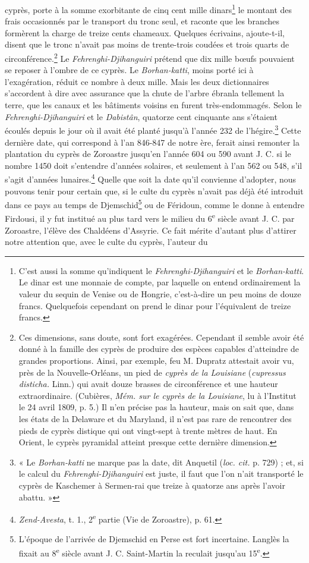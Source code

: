 \documentclass{article}
\begin{document}
cyprès, porte à la somme exorbitante de cinq cent mille dinars\footnote{C'est aussi la somme qu'indiquent le \emph{Fehrenghi-Djihanguiri} et le \emph{Borhan-katti}. Le dinar est une monnaie de compte, par laquelle on entend ordinairement la valeur du sequin de Venise ou de Hongrie, c'est-à-dire un peu moins de douze francs. Quelquefois cependant on prend le dinar pour l'équivalent de treize francs.} le montant des frais occasionnés par le transport du tronc seul, et raconte que les branches formèrent la charge de treize cents chameaux. Quelques écrivains, ajoute-t-il, disent que le tronc n'avait pas moins de trente-trois coudées et trois quarts de circonférence.\footnote{Ces dimensions, sans doute, sont fort exagérées. Cependant il semble avoir été donné à la famille des cyprès de produire des espèces capables d'atteindre de grandes proportions. Ainsi, par exemple, feu M. Dupratz attestait avoir vu, près de la Nouvelle-Orléans, un pied de \emph{cyprès de la Louisiane} (\emph{cupressus disticha.} Linn.) qui avait douze brasses de circonférence et une hauteur extraordinaire. (Cubières, \emph{Mém. sur le cyprès de la Louisiane}, lu à l'Institut le 24 avril 1809, p. 5.) Il n'en précise pas la hauteur, mais on sait que, dans les états de la Delaware et du Maryland, il n'est pas rare de rencontrer des pieds de cyprès distique qui ont vingt-sept à trente mètres de haut. En Orient, le cyprès pyramidal atteint presque cette dernière dimension.} Le \emph{Fehrenghi-Djihanguiri} prétend que dix mille bœufs pouvaient se reposer à l'ombre de ce cyprès. Le \emph{Borhan-katti}, moins porté ici à l'exagération, réduit ce nombre à deux mille. Mais les deux dictionnaires s'accordent à dire avec assurance que la chute de l'arbre ébranla tellement la terre, que les canaux et les bâtiments voisins en furent très-endommagés. Selon le \emph{Fehrenghi-Djihanguiri} et le \emph{Dabistân}, quatorze cent cinquante ans s'étaient écoulés depuis le jour où il avait été planté jusqu'à l'année 232 de l'hégire.\footnote{« Le \emph{Borhan-katti} ne marque pas la date, dit Anquetil (\emph{loc. cit.} p. 729) ; et, si le calcul du \emph{Fehrenghi-Djihanguiri} est juste, il faut que l'on n'ait transporté le cyprès de Kaschemer à Sermen-rai que treize à quatorze ans après l'avoir abattu. »} Cette dernière date, qui correspond à l'an 846-847 de notre ère, ferait ainsi remonter la plantation du cyprès de Zoroastre jusqu'en l'année 604 ou 590 avant J. C. si le nombre 1450 doit s'entendre d'années solaires, et seulement à l'an 562 ou 548, s'il s'agit d'années lunaires.\footnote{\emph{Zend-Avesta}, t. 1., 2\textsuperscript{e} partie (Vie de Zoroastre), p. 61.} Quelle que soit la date qu'il convienne d'adopter, nous pouvons tenir pour certain que, si le culte du cyprès n'avait pas déjà été introduit dans ce pays au temps de Djemschid\footnote{L'époque de l'arrivée de Djemschid en Perse est fort incertaine. Langlès la fixait au 8\textsuperscript{e} siècle avant J. C. Saint-Martin la reculait jusqu'au 15\textsuperscript{e}.} ou de Féridoun, comme le donne à entendre Firdousi, il y fut institué au plus tard vers le milieu du 6\textsuperscript{e} siècle avant J. C. par Zoroastre, l'élève des Chaldéens d'Assyrie. Ce fait mérite d'autant plus d'attirer notre attention que, avec le culte du cyprès, l'auteur du 
\end{document}
